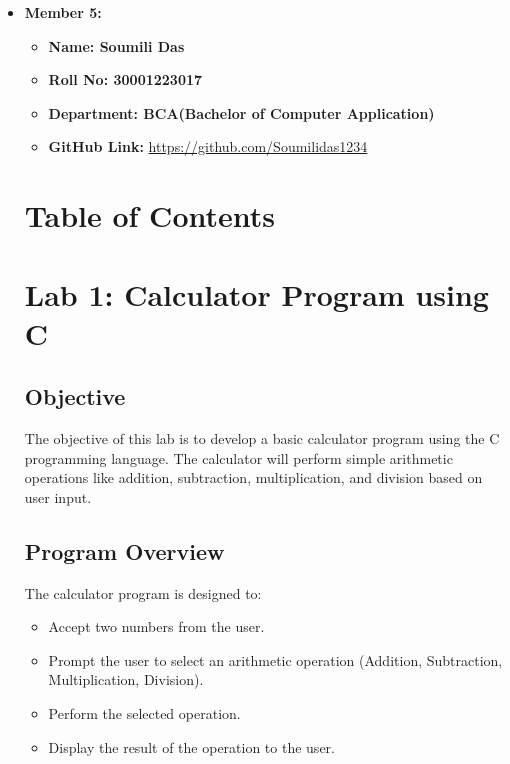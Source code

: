 \documentclass[a4paper,15pt]{article}
\begin{document}
\begin{itemize}[leftmargin=1.5cm]
    \item \textbf{Member 5:} 
    \begin{itemize}[leftmargin=1.5cm]
        \item \textbf{Name: Soumili Das } 
        \item \textbf{Roll No: 30001223017 } 
        \item \textbf{Department: BCA(Bachelor of Computer Application) } 
        \item \textbf{GitHub Link:} \url{https://github.com/Soumilidas1234}
\end{itemize}

\vspace{1cm}

\section*{Table of Contents}
\tableofcontents

\vspace{1cm}

\newpage

\section{Lab 1: Calculator Program using C}

\subsection{Objective}
The objective of this lab is to develop a basic calculator program using the C programming language. The calculator will perform simple arithmetic operations like addition, subtraction, multiplication, and division based on user input.

\subsection{Program Overview}
The calculator program is designed to:
\begin{itemize}
    \item Accept two numbers from the user.
    \item Prompt the user to select an arithmetic operation (Addition, Subtraction, Multiplication, Division).
    \item Perform the selected operation.
    \item Display the result of the operation to the user.
\end{itemize}


\end{itemize}
\end{document}
